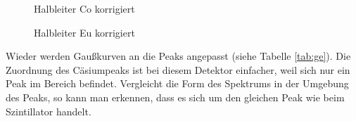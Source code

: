 \newpage

\begin{figure}[h]
\centering
{}
\caption{Halbleiter Co korrigiert}
\label{fig:ge_co}
\end{figure}

\begin{figure}[!h]
\centering
{}
\caption{Halbleiter Eu korrigiert}
\label{fig:ge_eu}
\end{figure}

Wieder werden Gaußkurven an die Peaks angepasst (siehe Tabelle \ref{tab:ge}). Die Zuordnung des Cäsiumpeaks ist bei diesem Detektor einfacher, weil sich nur ein Peak im Bereich befindet. Vergleicht die Form des Spektrums in der Umgebung des Peaks, so kann man erkennen, dass es sich um den gleichen Peak wie beim Szintillator handelt.\\

